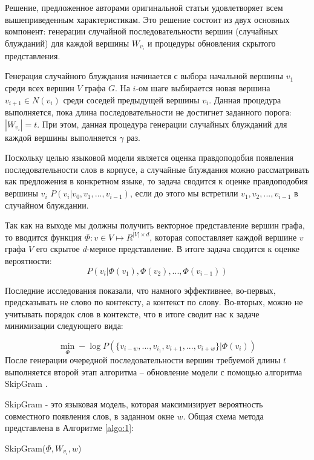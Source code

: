 Решение, предложенное авторами оригинальной статьи удовлетворяет всем вышеприведенным характеристикам. Это решение состоит
из двух основных компонент: генерации случайной последовательности вершин (случайных блужданий) для каждой вершины $W_{v_i}$ и процедуры обновления скрытого представления.

Генерация случайного блуждания начинается с выбора начальной
вершины $v_1$ среди всех вершин $V$ графа $G$.  На $i$-ом шаге выбирается новая вершина $v_{i+1} \in N(v_i)$ среди соседей предыдущей вершины $v_i$. Данная процедура выполняется, пока длина последовательности
не достигнет заданного порога: $|W_{v_i}| = t$. При этом, данная процедура генерации случайных блужданий для каждой вершины выполняется $\gamma$ раз.

Поскольку целью языковой модели является оценка правдоподобия появления последовательности слов в корпусе, а случайные блуждания можно рассматривать как предложения в конкретном языке, то задача сводится к оценке правдоподобия вершины $v_i$ $P(v_i| v_0, v_1, ..., v_{i-1})$, если до этого мы встретили  $v_1, v_2, ..., v_{i-1}$ в случайном блуждании.

Так как на выходе мы должны получить векторное представление вершин графа, то вводится функция $\Phi: v \in V \mapsto R^{|V| \times d} $, которая сопоставляет каждой вершине $v$ графа $V$ его скрытое $d$-мерное представление. В итоге задача сводится к оценке вероятности:
$$P(v_i|\Phi(v_1), \Phi(v_2), ..., \Phi(v_{i-1}))$$



Последние исследования показали, что намного эффективнее, во-первых, предсказывать не слово по контексту, а контекст по слову.  Во-вторых, можно не учитывать порядок слов в контексте, что в итоге сводит нас к задаче минимизации следующего вида:

$$\min_{\Phi} -\log P(\{v_{i-w}, ..., v_{i_1}, v_{i+1}, ..., v_{i+w}\} | \Phi (v_i))$$
После генерации очередной последовательности вершин требуемой длины $t$ выполняется второй этап алгоритма -- обновление модели с помощью алгоритма SkipGram \cite{skipgram}. 

SkipGram - это языковая модель, которая максимизирует вероятность совместного появления слов, в заданном  окне $w$. Общая схема метода представлена в Алгоритме \ref{algo:1}:

\begin{algorithm}[H]

    \caption{SkipGram($\Phi, W_{v_i}, w$)}
    \label{algo:1}
\end{algorithm}

